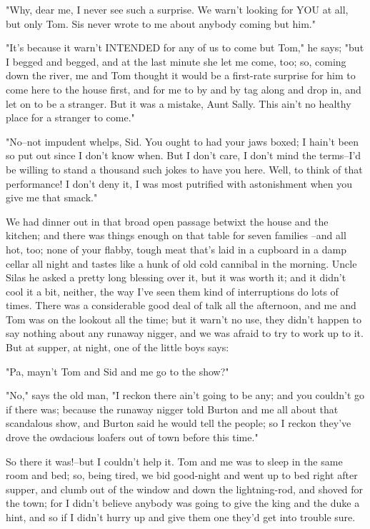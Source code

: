 "Why, dear me, I never see such a surprise.  We warn't looking for YOU at
all, but only Tom.  Sis never wrote to me about anybody coming but him."

"It's because it warn't INTENDED for any of us to come but Tom," he says;
"but I begged and begged, and at the last minute she let me come, too;
so, coming down the river, me and Tom thought it would be a first-rate
surprise for him to come here to the house first, and for me to by and by
tag along and drop in, and let on to be a stranger.  But it was a
mistake, Aunt Sally.  This ain't no healthy place for a stranger to
come."

"No--not impudent whelps, Sid.  You ought to had your jaws boxed; I
hain't been so put out since I don't know when.  But I don't care, I
don't mind the terms--I'd be willing to stand a thousand such jokes to
have you here. Well, to think of that performance!  I don't deny it, I
was most putrified with astonishment when you give me that smack."

We had dinner out in that broad open passage betwixt the house and the
kitchen; and there was things enough on that table for seven families
--and all hot, too; none of your flabby, tough meat that's laid in a
cupboard in a damp cellar all night and tastes like a hunk of old cold
cannibal in the morning.  Uncle Silas he asked a pretty long blessing
over it, but it was worth it; and it didn't cool it a bit, neither, the
way I've seen them kind of interruptions do lots of times.  There was a
considerable good deal of talk all the afternoon, and me and Tom was on
the lookout all the time; but it warn't no use, they didn't happen to say
nothing about any runaway nigger, and we was afraid to try to work up to
it.  But at supper, at night, one of the little boys says:

"Pa, mayn't Tom and Sid and me go to the show?"

"No," says the old man, "I reckon there ain't going to be any; and you
couldn't go if there was; because the runaway nigger told Burton and me
all about that scandalous show, and Burton said he would tell the people;
so I reckon they've drove the owdacious loafers out of town before this
time."

So there it was!--but I couldn't help it.  Tom and me was to sleep in the
same room and bed; so, being tired, we bid good-night and went up to bed
right after supper, and clumb out of the window and down the
lightning-rod, and shoved for the town; for I didn't believe anybody was
going to give the king and the duke a hint, and so if I didn't hurry up
and give them one they'd get into trouble sure.

